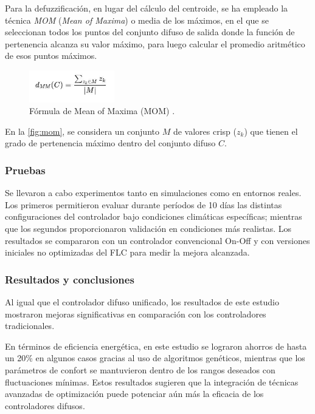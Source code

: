 Para la defuzzificación, en lugar del cálculo del centroide, se ha empleado la técnica \textit{MOM} (\textit{Mean of Maxima}) o media de los máximos, en el que se seleccionan todos los puntos del conjunto difuso de salida donde la función de pertenencia alcanza su valor máximo, para luego calcular el promedio aritmético de esos puntos máximos.

\begin{figure}[H]
	\centering
	\includegraphics[width=0.33\textwidth]{imgs/mom.JPG}
	\caption{Fórmula de Mean of Maxima (MOM) \parencite{klir1996fuzzy}.}
	\label{fig:mom}
\end{figure}

En la \autoref{fig:mom}, se considera un conjunto $M$ de valores crisp ($z_k$) que tienen el grado de pertenencia máximo dentro del conjunto difuso $C$. 

\subsubsection{Pruebas}

Se llevaron a cabo experimentos tanto en simulaciones como en entornos reales. Los primeros permitieron evaluar durante períodos de 10 días las distintas configuraciones del controlador bajo condiciones climáticas específicas; mientras que los segundos proporcionaron validación en condiciones más realistas. Los resultados se compararon con un controlador convencional On-Off y con versiones iniciales no optimizadas del FLC para medir la mejora alcanzada.

\subsubsection{Resultados y conclusiones}

Al igual que el controlador difuso unificado, los resultados de este estudio mostraron mejoras significativas en comparación con los controladores tradicionales.

En términos de eficiencia energética, en este estudio se lograron ahorros de hasta un 20\% en algunos casos gracias al uso de algoritmos genéticos, mientras que los parámetros de confort se mantuvieron dentro de los rangos deseados con fluctuaciones mínimas. Estos resultados sugieren que la integración de técnicas avanzadas de optimización puede potenciar aún más la eficacia de los controladores difusos.

